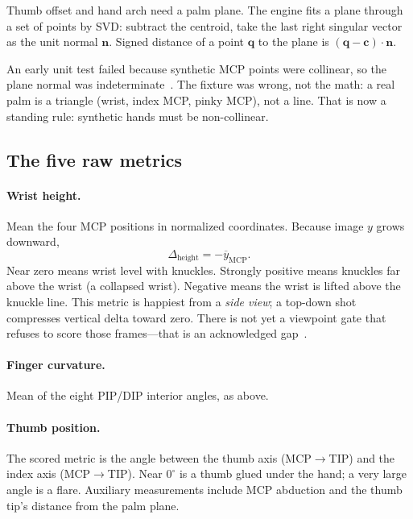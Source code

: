 \documentclass[11pt,a4paper]{article}
\begin{document}
Thumb offset and hand arch need a palm plane.
The engine fits a plane through a set of points by SVD: subtract the centroid, take the last right singular vector as the unit normal \(\mathbf{n}\).
Signed distance of a point \(\mathbf{q}\) to the plane is \((\mathbf{q}-\mathbf{c})\cdot\mathbf{n}\).

An early unit test failed because synthetic MCP points were collinear, so the plane normal was indeterminate~\cite{errors}.
The fixture was wrong, not the math: a real palm is a triangle (wrist, index MCP, pinky MCP), not a line.
That is now a standing rule: synthetic hands must be non-collinear.

\subsection{The five raw metrics}

\paragraph{Wrist height.}
Mean the four MCP positions in normalized coordinates.
Because image \(y\) grows downward,
\begin{equation}
  \Delta_{\text{height}} = -\overline{y}_{\text{MCP}}.
\end{equation}
Near zero means wrist level with knuckles.
Strongly positive means knuckles far above the wrist (a collapsed wrist).
Negative means the wrist is lifted above the knuckle line.
This metric is happiest from a \emph{side view}; a top-down shot compresses vertical delta toward zero.
There is not yet a viewpoint gate that refuses to score those frames---that is an acknowledged gap~\cite{mlupgrade}.

\paragraph{Finger curvature.}
Mean of the eight PIP/DIP interior angles, as above.

\paragraph{Thumb position.}
The scored metric is the angle between the thumb axis (MCP\(\to\)TIP) and the index axis (MCP\(\to\)TIP).
Near \(0^\circ\) is a thumb glued under the hand; a very large angle is a flare.
Auxiliary measurements include MCP abduction and the thumb tip's distance from the palm plane.
\end{document}
